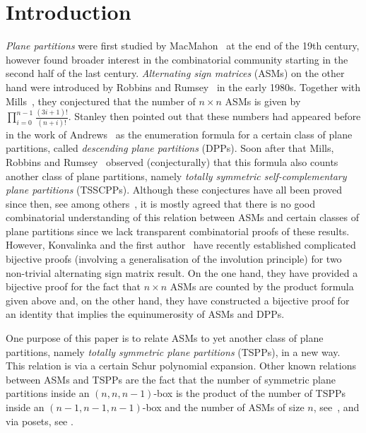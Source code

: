 \documentclass[11pt]{article}
\theoremstyle{definition}
\numberwithin{equation}{section}
\newcounter{x}
\newcounter{y}
\newcounter{z}
\begin{document}
\section{Introduction}
\emph{Plane partitions} were first studied by MacMahon~\cite{MacMahon97} at the end of the 19th century, however found broader interest in the combinatorial community starting in the second half of the last century. \emph{Alternating sign matrices} (ASMs) on the other hand were introduced by Robbins and Rumsey~\cite{RobbinsRumsey86} in the early 1980s. Together with Mills~\cite{MillsRobbinsRumsey82}, they conjectured that the number of $n \times n$ ASMs is given by $\prod_{i=0}^{n-1} \frac{(3i+1)!}{(n+i)!}$. Stanley then pointed out that these numbers had appeared before in the work of Andrews~\cite{Andrews79} as the enumeration formula for a certain class of plane partitions, called \emph{descending plane partitions} (DPPs). Soon after that Mills, Robbins and Rumsey~\cite{MillsRobbinsRumsey86} observed (conjecturally) that this formula also counts another class of plane partitions, namely \emph{totally symmetric self-complementary plane partitions} (TSSCPPs). Although these conjectures have all been proved since then, see among others~\cite{Andrews94,Zeilberger96}, it is mostly agreed that there is no good combinatorial understanding of this relation between ASMs and certain classes of plane partitions since we lack transparent combinatorial proofs of these results. However, Konvalinka and the first author~\cite{cube,FischerKonvalinka20plus} have recently established complicated bijective proofs (involving a generalisation of the involution principle) for two non-trivial alternating sign matrix result. On the one hand, they have provided a bijective proof for the fact that $n \times n$ ASMs are counted by the product formula given above and, on the other hand, they have constructed a bijective proof for 
an identity that implies the equinumerosity of ASMs and DPPs.

One purpose of this paper is to relate ASMs to yet another class of plane partitions, namely \emph{totally symmetric plane partitions} (TSPPs), in a new way. This relation is via a certain Schur polynomial expansion. 
Other known relations between ASMs and TSPPs are the fact that the number of symmetric plane partitions inside an \mbox{$(n,n,n-1)$}-box is the product of the number of TSPPs inside an $(n-1,n-1,n-1)$-box and the number of ASMs of size $n$, see~\cite{Fischer05}, and via posets, see \cite[Section 8]{Striker11}.
\end{document}

